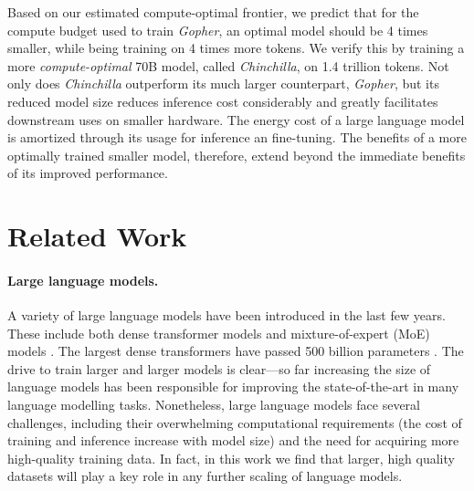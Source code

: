Based on our estimated compute-optimal frontier, we predict that for the compute budget used to train \textit{Gopher}, an optimal model should be 4 times smaller, while being training on 4 times more tokens. We verify this by training a more \textit{compute-optimal} 70B model, called \textit{Chinchilla}, on 1.4 trillion tokens. Not only does \textit{Chinchilla} outperform its much larger counterpart, \textit{Gopher}, but its reduced model size reduces inference cost considerably and greatly facilitates downstream uses on smaller hardware. The energy cost of a large language model is amortized through its usage for inference an fine-tuning. The benefits of a more optimally trained smaller model, therefore, extend beyond the immediate benefits of its improved performance.  

\section{Related Work}
\label{sec:related_work}
\paragraph{Large language models.} A variety of large language models have been introduced in the last few years. These include both dense transformer models \citep{gpt3, jurassic, nlg530b, rae2021gopher, thoppilan2022lamda} and mixture-of-expert (MoE) models \citep{du2021glam, fedus2021switch, zoph2022designing}. The largest dense transformers have passed 500 billion parameters \citep{nlg530b}. The drive to train larger and larger models is clear---so far increasing the size of language models has been responsible for improving the state-of-the-art in many language modelling tasks. Nonetheless, large language models face several challenges, including their overwhelming computational requirements (the cost of training and inference increase with model size) \citep{rae2021gopher, thoppilan2022lamda} and the need for acquiring more high-quality training data. In fact, in this work we find that larger, high quality datasets will play a key role in any further scaling of language models.

